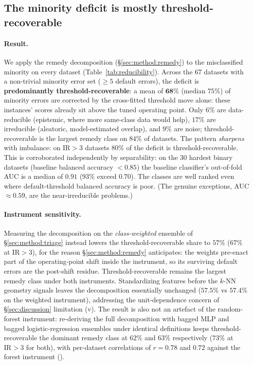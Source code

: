 \subsection{The minority deficit is mostly threshold-recoverable}\label{sec:results:remedy}

\paragraph{Result.}
We apply the remedy decomposition (\S\ref{sec:method:remedy})
to the misclassified minority on every dataset (Table~\ref{tab:reducibility}).
Across the 67 datasets with a non-trivial minority error set ($\ge5$ default
errors), the deficit is
\textbf{predominantly threshold-recoverable}: a mean of $\mathbf{68\%}$ (median
$75\%$) of minority errors are corrected by the cross-fitted threshold move
alone: these instances' scores already sit
above the tuned operating point. Only $6\%$ are data-reducible (epistemic, where more
same-class data would help), $17\%$ are irreducible (aleatoric, model-estimated
overlap), and $9\%$ are noise; threshold-recoverable is the largest remedy class
on $84\%$ of datasets. The pattern \emph{sharpens} with imbalance: on
$\mathrm{IR}>3$ datasets $80\%$ of the deficit is threshold-recoverable. This is
corroborated independently by separability: on the 30 hardest binary datasets
(baseline balanced accuracy $<0.85$) the baseline classifier's out-of-fold AUC is a
median of $0.91$ ($93\%$ exceed $0.70$). The classes are well ranked even where
default-threshold balanced accuracy is poor. (The genuine exceptions, AUC
$\approx0.59$, are the near-irreducible problems.)

\paragraph{Instrument sensitivity.} Measuring the decomposition on the
\emph{class-weighted} ensemble of \S\ref{sec:method:triage} instead lowers the
threshold-recoverable share to $57\%$ ($67\%$ at $\mathrm{IR}>3$), for the reason
\S\ref{sec:method:remedy} anticipates: the weights pre-enact part of the
operating-point shift inside the instrument, so its surviving default errors are
the post-shift residue. Threshold-recoverable remains the largest remedy class
under both instruments. Standardizing features before the $k$-NN geometry
signals leaves the decomposition essentially unchanged ($57.5\%$ vs $57.4\%$ on
the weighted instrument), addressing the unit-dependence concern of
\S\ref{sec:discussion} limitation (v). The result is also not an
artefact of the random-forest instrument: re-deriving the full decomposition
with bagged MLP and bagged logistic-regression ensembles under identical
definitions keeps threshold-recoverable the dominant remedy class at $62\%$
and $63\%$ respectively ($73\%$ at $\mathrm{IR}>3$ for both), with per-dataset
correlations of $r=0.78$ and $0.72$ against the forest instrument
().

